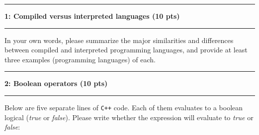 \documentclass[11pt]{article}
\newcommand\question[2]{\vspace{.25in}\hrule\textbf{#1: #2}\vspace{.5em}\hrule\vspace{.10in}}
\begin{document}
\raggedright
\newcommand\Page{\page  / \lastPage}
\newcommand\page{1}
\newcommand\qN[2]{\Large {#1} \small{#2} \normalsize}

\newcommand\dueDate{\today}
\newcommand\hwnum{2}
\newcommand\ExNum{}

\newcommand\lastPage{3}

\lhead{\large Homework \hwnum }
\rhead{\rightHead}
\newcommand\rightHead{\large Due Sep 15, 2021}

\question{1}{Compiled versus interpreted languages (10 pts)}
In your own words, please summarize the major similarities and differences
between compiled and interpreted programming languages, and provide at least
three examples (programming languages) of each. \\[4cm]

\question{2}{Boolean operators (10 pts)}
Below are five separate lines of \texttt{C++} code. Each of them evaluates to a
boolean logical (\textit{true} or \textit{false}). Please write whether the expression will
evaluate to \textit{true} or \textit{false}:
\begin{figure}[H]
    \center
\end{figure}
\end{document}
